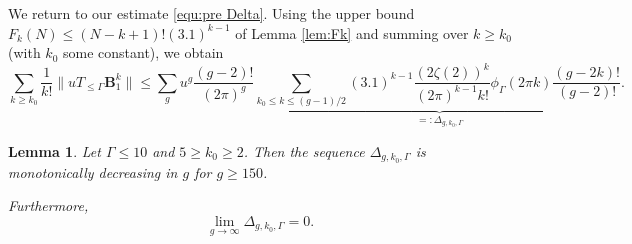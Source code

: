 \documentclass[12pt]{amsart}
\newtheorem{lem}[thm]{Lemma}
\theoremstyle{definition}
\numberwithin{equation}{section}
\newcommand{\bB}{\mathbf{B}}
\theoremstyle{definition} %
\theoremstyle{remark}
\begin{document}
We return to our estimate \eqref{equ:pre Delta}. Using the upper bound $F_k(N)\leq (N - k + 1)! (3.1)^{k-1}$
of Lemma \ref{lem:Fk} and summing over $k\geq k_0$ (with $k_0$ some constant), we obtain
\begin{equation} \label{r1}
\sum_{k\geq k_0}\frac1{k!}\|u T_{\leq \Gamma} \bB_1^k\|
\leq 
\sum_g u^g \frac{(g-2)!}{(2\pi)^g} 
\underbrace{
\sum_{k_0\leq k\leq (g-1)/2}(3.1)^{k-1}
\frac{(2\zeta(2))^k }{(2\pi)^{k-1}k!}\phi_\Gamma(2\pi k) \frac{(g-2k)!}{(g-2)!}.
}_{=:\Delta_{g,k_0,\Gamma}}
\end{equation}

\begin{lem}\label{lem:Deltap mono}
    Let $\Gamma\leq 10$ and $5\geq k_0\geq 2$.
Then the sequence $\Delta_{g,k_0,\Gamma}$ is monotonically decreasing in $g$ for $g\geq 150$. 

Furthermore, 
\[
\lim_{g\to \infty} \Delta_{g,k_0,\Gamma}=0.
\]
\end{lem}
\end{document}
